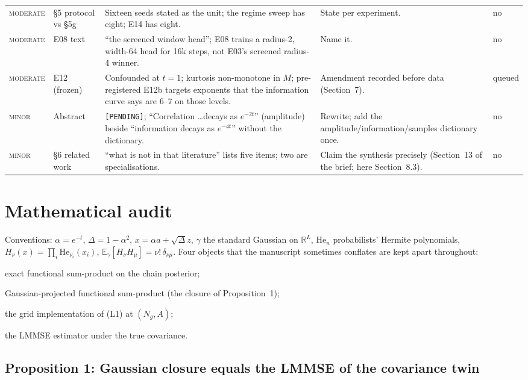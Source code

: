 \documentclass[11pt,a4paper]{article}
\newcommand{\sev}[1]{\textsc{#1}}
\newcommand{\Hen}[1]{\mathrm{He}_{#1}}
\newcommand{\E}{\mathbb{E}}
\newcommand{\R}{\mathbb{R}}
\theoremstyle{definition}
\theoremstyle{remark}
\begin{document}
{\begin{longtable}{@{}>{\raggedright\arraybackslash}p{1.75cm}>{\raggedright\arraybackslash}p{2.0cm}>{\raggedright\arraybackslash}p{6.05cm}>{\raggedright\arraybackslash}p{4.3cm}>{\raggedright\arraybackslash}p{0.9cm}@{}}
\sev{moderate} & \S5 protocol vs \S5g & Sixteen seeds stated as the unit; the regime sweep has eight; E14 has eight. & State per experiment. & no \\
\sev{moderate} & E08 text & ``the screened window head''; E08 trains a radius-2, width-64 head for 16k steps, not E03's screened radius-4 winner. & Name it. & no \\
\sev{moderate} & E12 (frozen) & Confounded at $t=1$; kurtosis non-monotone in $M$; pre-registered E12b targets exponents that the information curve says are $6$--$7$ on those levels. & Amendment recorded before data (Section~7). & queued \\
\sev{minor} & Abstract & \texttt{[PENDING]}; ``Correlation \ldots decays as $e^{-2t}$'' (amplitude) beside ``information decays as $e^{-4t}$'' without the dictionary. & Rewrite; add the amplitude/information/samples dictionary once. & no \\
\sev{minor} & \S6 related work & ``what is not in that literature'' lists five items; two are specialisations. & Claim the synthesis precisely (Section~13 of the brief; here Section~8.3). & no \\
\bottomrule
\end{longtable}}

\section{Mathematical audit}
\label{sec:math}

Conventions: $\alpha=e^{-t}$, $\Delta=1-\alpha^2$, $x=\alpha a+\sqrt\Delta z$, $\gamma$ the standard Gaussian on $\R^L$, $\Hen{n}$ probabilists' Hermite polynomials, $H_\nu(x)=\prod_i\Hen{\nu_i}(x_i)$, $\E_\gamma[H_\nu H_\mu]=\nu!\,\delta_{\nu\mu}$. Four objects that the manuscript sometimes conflates are kept apart throughout:
\begin{description}[leftmargin=1.6em,itemsep=0.2em]
\item[(L1)] exact functional sum-product on the chain posterior;
\item[(L2)] Gaussian-projected functional sum-product (the closure of Proposition~1);
\item[(L3)] the grid implementation of (L1) at $(N_g, A)$;
\item[(L4)] the LMMSE estimator under the true covariance.
\end{description}

\subsection{Proposition 1: Gaussian closure equals the LMMSE of the covariance twin}
\end{document}
